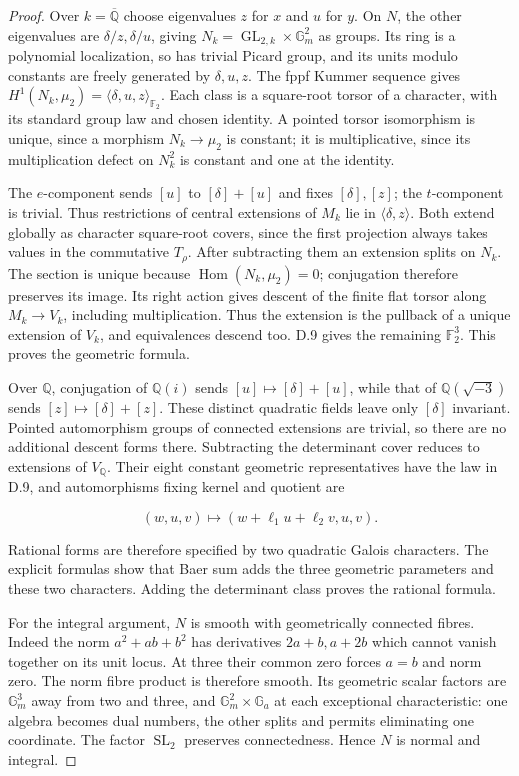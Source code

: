 \begin{proof}
Over $k=\overline{\mathbb Q}$ choose eigenvalues $z$ for $x$
and $u$ for $y$. On $N$, the other eigenvalues are
$\delta/z,\delta/u$, giving
$N_k=\operatorname{GL}_{2,k}\times\mathbb G_m^2$ as groups.
Its ring is a polynomial localization, so has trivial
Picard group, and its units modulo constants are freely
generated by $\delta,u,z$.
The fppf Kummer sequence
\cite[Lemma 59.28.3]{D_StacksKummer} gives
$H^1(N_k,\mu_2)=\langle\delta,u,z\rangle_{\mathbb F_2}$.
Each class is a square-root torsor of a character, with
its standard group law and chosen identity.
A pointed torsor isomorphism is unique, since a morphism
$N_k\to\mu_2$ is constant; it is multiplicative, since
its multiplication defect on $N_k^2$ is constant and
one at the identity.

The $e$-component sends $[u]$ to $[\delta]+[u]$ and fixes
$[\delta],[z]$; the $t$-component is trivial.
Thus restrictions of central extensions of $M_k$ lie
in $\langle\delta,z\rangle$. Both extend globally as
character square-root covers, since the first projection
always takes values in the commutative $T_\rho$.
After subtracting them an extension splits on $N_k$.
The section is unique because $\operatorname{Hom}(N_k,\mu_2)=0$;
conjugation therefore preserves its image.
Its right action gives descent of the finite flat torsor
along $M_k\to V_k$, including multiplication.
Thus the extension is the pullback of a unique extension
of $V_k$, and equivalences descend too.
D.9 gives the remaining $\mathbb F_2^3$.
This proves the geometric formula.

Over $\mathbb Q$, conjugation of $\mathbb Q(i)$ sends
$[u]\mapsto[\delta]+[u]$, while that of
$\mathbb Q(\sqrt{-3})$ sends $[z]\mapsto[\delta]+[z]$.
These distinct quadratic fields leave only $[\delta]$
invariant. Pointed automorphism groups of connected
extensions are trivial, so there are no additional
descent forms there. Subtracting the determinant cover
reduces to extensions of $V_{\mathbb Q}$.
Their eight constant geometric representatives have the
law in D.9, and automorphisms fixing kernel and quotient are

$$
(w,u,v)\longmapsto(w+\ell_1u+\ell_2v,u,v).
$$

Rational forms are therefore specified by two quadratic
Galois characters. The explicit formulas show that Baer
sum adds the three geometric parameters and these two
characters. Adding the determinant class proves the
rational formula.

For the integral argument, $N$ is smooth with geometrically
connected fibres. Indeed the norm $a^2+ab+b^2$ has derivatives
$2a+b,a+2b$ which cannot vanish together on its unit locus.
At three their common zero forces $a=b$ and norm zero.
The norm fibre product is therefore smooth.
Its geometric scalar factors are $\mathbb G_m^3$
away from two and three, and $\mathbb G_m^2\times\mathbb G_a$
at each exceptional characteristic: one algebra becomes
dual numbers, the other splits and permits eliminating
one coordinate. The factor $\operatorname{SL}_2$ preserves
connectedness. Hence $N$ is normal and integral.


\end{proof}
